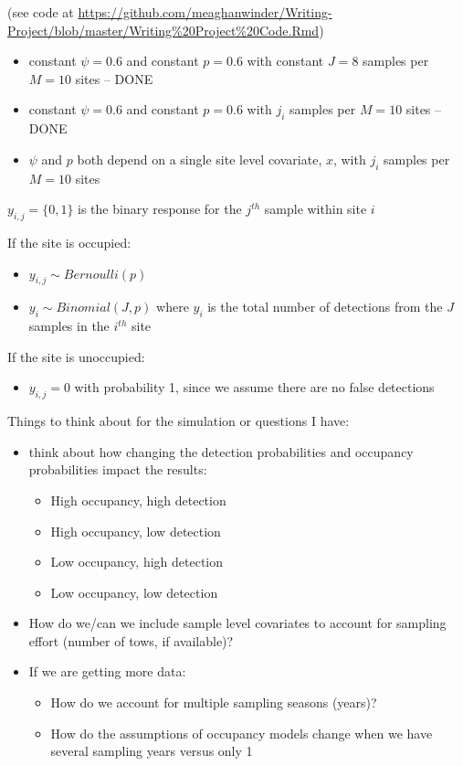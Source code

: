 \documentclass[12pt]{article}\usepackage[]{graphicx}\usepackage[]{color}
\begin{document}
 (see code at \url{https://github.com/meaghanwinder/Writing-Project/blob/master/Writing%20Project%20Code.Rmd})

\begin{itemize}
\item constant $\psi = 0.6$ and constant $p = 0.6$ with constant $J = 8$ samples per $M = 10$ sites -- DONE
\item constant $\psi = 0.6$ and constant $p = 0.6$ with $j_i$ samples per $M = 10$ sites -- DONE
\item $\psi$ and $p$ both depend on a single site level covariate, $x$, with $j_i$ samples per $M = 10$ sites
\end{itemize}

$y_{i,j} = \{0, 1\}$ is the binary response for the $j^{th}$ sample within site $i$

If the site is occupied: 
\begin{itemize}
\item $y_{i,j} \sim Bernoulli(p)$
\item $y_i \sim Binomial(J, p)$ where $y_i$ is the total number of detections from the $J$ samples in the $i^{th}$ site 
\end{itemize}

If the site is unoccupied: 
\begin{itemize}
\item $y_{i,j} = 0$ with probability 1, since we assume there are no false detections
\end{itemize}







Things to think about for the simulation or questions I have: 
\begin{itemize}
\item think about how changing the detection probabilities and occupancy probabilities impact the results: 
	\begin{itemize}
	\item High occupancy, high detection
	\item High occupancy, low detection 
	\item Low occupancy, high detection 
	\item Low occupancy, low detection 
	\end{itemize}
\item How do we/can we include sample level covariates to account for sampling effort (number of tows, if available)?
\item If we are getting more data:
	\begin{itemize}
	\item How do we account for multiple sampling seasons (years)? 
	\item How do the assumptions of occupancy models change when we have several sampling years versus only 1
\end{itemize}
\end{itemize}
\end{document}
